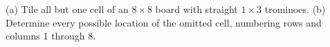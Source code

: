 (a) Tile all but one cell of an $8\times8$ board with straight $1\times3$ trominoes. (b) Determine every possible location of the omitted cell, numbering rows and columns 1 through 8.
